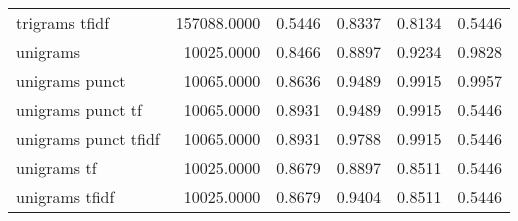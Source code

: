 \begin{tabular}{lrrrrr}
trigrams tfidf             & 157088.0000 & 0.5446 &       0.8337 &         0.8134 &               0.5446 \\
unigrams                   &  10025.0000 & 0.8466 &       0.8897 &         0.9234 &               0.9828 \\
unigrams punct             &  10065.0000 & 0.8636 &       0.9489 &         0.9915 &               0.9957 \\
unigrams punct tf          &  10065.0000 & 0.8931 &       0.9489 &         0.9915 &               0.5446 \\
unigrams punct tfidf       &  10065.0000 & 0.8931 &       0.9788 &         0.9915 &               0.5446 \\
unigrams tf                &  10025.0000 & 0.8679 &       0.8897 &         0.8511 &               0.5446 \\
unigrams tfidf             &  10025.0000 & 0.8679 &       0.9404 &         0.8511 &               0.5446 \\
\bottomrule
\end{tabular}
